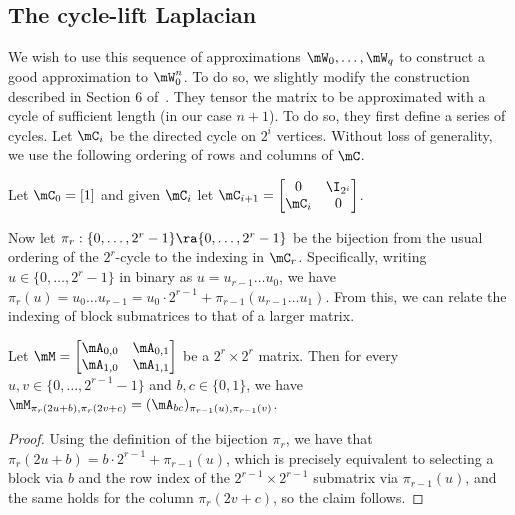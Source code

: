 \documentclass{toc}
\begin{document}
\subsection{The cycle-lift Laplacian}
We wish to use this sequence of approximations $\mW_0,\ldots,\mW_q$ to construct a good approximation to $\mW_0^n$. To do so, we slightly modify the construction described in Section 6 of~\cite{AhmadinejadKeMuPeSiVa19}. They tensor the matrix to be approximated with a cycle of sufficient length (in our case $n+1$). To do so, they first define a series of cycles. Let $\mC_i$ be the directed cycle on $2^i$ vertices. Without loss of generality, we use the following ordering of rows and columns of $\mC$.

\begin{definition}
Let $\mC_0=[1]$ and given $\mC_i$ let $\mC_{i+1}=\begin{bmatrix}0&\I_{2^i}\\ \mC_{i}&0\end{bmatrix}$.
\end{definition}
Now let $\pi_r:\{0,\ldots,2^r-1\}\ra\{0,\ldots,2^r-1\}$ be the bijection from the usual ordering of the $2^r$-cycle to the indexing in $\mC_r$. Specifically, writing $u\in \{0,\ldots,2^{r}-1\}$ in binary as $u=u_{r-1}\ldots u_0$, we have $\pi_r(u)=u_0\ldots u_{r-1}=u_0\cdot 2^{r-1}+\pi_{r-1}(u_{r-1}\ldots u_1)$. From this, we can relate the indexing of block submatrices to that of a larger 
matrix. %
\begin{claim}\label{clm:indexStruct}
Let $\mM=\begin{bmatrix}\mA_{0,0} & \mA_{0,1}\\ \mA_{1,0} & \mA_{1,1}\end{bmatrix}$ be a $2^r\times 2^r$ matrix. Then for every $u,v\in \{0,\ldots,2^{r-1}-1\}$ and $b,c\in \{0,1\}$, we have $\mM_{\pi_r(2u+b),\pi_r(2v+c)}=(\mA_{bc})_{\pi_{r-1}(u),\pi_{r-1}(v)}$.
\end{claim}
\begin{proof}
Using the definition of the bijection $\pi_r$, we have that $\pi_r(2u+b)=b\cdot 2^{r-1}+\pi_{r-1}(u)$, which is precisely equivalent to selecting a block via $b$ and the row index of the $2^{r-1}\times 2^{r-1}$ submatrix via $\pi_{r-1}(u)$, and the same holds for the column $\pi_r(2v+c)$, so the claim follows.
\end{proof}
\end{document}
